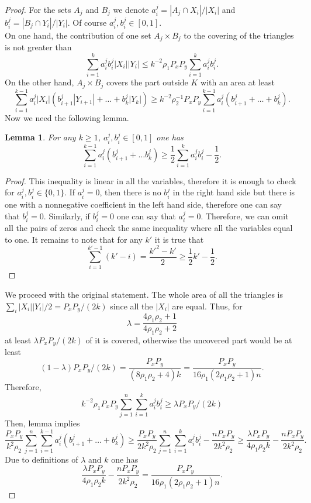 \documentclass{amsart}
\newtheorem{lemma}[theorem]{Lemma}
\theoremstyle{remark}
\numberwithin{equation}{section}
\numberwithin{figure}{section}
\begin{document}
\begin{proof}
	For the sets $A_j$ and $B_j$ we denote $a_i^j = |A_j\cap X_i|/|X_i|$ and $b_i^j = |B_j\cap Y_i|/|Y_i|$. Of course $a_i^j, b_i^j \in [0, 1]$.
	\\On one hand, the contribution of one set $A_j\times B_j$ to the covering of the triangles is not greater than
	\[
	\sum_{i=1}^k a_i^j b_i^j |X_i||Y_i| \leq k^{-2}\rho_1 P_x P_y \sum_{i=1}^k a_i^j b_i^j.
	\]
	On the other hand, $A_j\times B_j$ covers the part outside $K$ with an area at least
	\[
	\sum_{i=1}^{k-1} a_i^j |X_i|(b_{i+1}^j |Y_{i+1}| + \ldots + b_k^j|Y_k|) \geq k^{-2}\rho_2^{-1} P_x P_y \sum_{i=1}^{k-1}a_i^j (b_{i+1}^j +\ldots + b_k^j).
	\]
	Now we need the following lemma.
	\begin{lemma}
		For any $k\geq 1$, $a_i^j, b_i^j \in [0, 1]$ one has
		\[
		\sum_{i=1}^{k-1} a_i^j (b_{i+1}^j + \ldots b_k^j) \geq \frac{1}{2} \sum_{i=1}^k a_i^j b_i^j - \frac{1}{2}.
		\]
	\end{lemma}	
	\begin{proof}
		This inequality is linear in all the variables, therefore it is enough to check for $a_i^j, b_i^j \in \{0, 1\}$.
		If $a_i^j = 0$, then there is no $b_i^j$ in the right hand side but there is one with a nonnegative coefficient in the left hand side, therefore one can say that $b_i^j = 0$.
		Similarly, if $b_i^j = 0$ one can say that $a_i^j = 0$. Therefore, we can omit all the pairs of zeros and check the same inequality where all the variables equal to one. It remains to note that for any $k'$ it is true that
		\[
		\sum_{i=1}^{k'-1} (k'-i) = \frac{k'^2 - k'}{2}\geq \frac{1}{2}k' -\frac{1}{2}.
		\]
	\end{proof}
	We proceed with the original statement. The whole area of all the triangles is $\sum_i |X_i| |Y_i|/2 = P_x P_y / (2k)$ since all the $|X_i|$ are equal. Thus, for 
	\[
	\lambda = \frac{4\rho_1\rho_2 + 1}{ 4\rho_1\rho_2+2}
	\]
	at least $\lambda P_x P_y / (2k)$ of it is covered, otherwise the uncovered part would be at least 
	\[
	(1 - \lambda) P_x P_y / (2k) = \frac{P_x P_y}{(8\rho_1\rho_2 + 4) k} = \frac{P_x P_y}{16\rho_1 (2\rho_1\rho_2+1)n}.
	\]
	Therefore,
	\[
	k^{-2}\rho_1 P_x P_y \sum_{j=1}^n \sum_{i=1}^{k} a_i^j b_i^j \geq \lambda P_x P_y / (2k)
	\]
	Then, lemma implies
	\[
	\frac{P_x P_y}{k^2 \rho_2}\sum_{j=1}^n \sum_{i=1}^{k-1} a_i^j (b_{i+1}^j + \ldots + b_k^j) 
	\geq \frac{P_x P_y}{2k^2\rho_2} \sum_{j=1}^n \sum_{i=1}^k a_i^j b_i^j - \frac{n P_x P_y}{2k^2\rho_2 }\geq \frac{\lambda P_x P_y}{4\rho_1\rho_2 k} - \frac{n P_x P_y}{2k^2\rho_2 }.
	\]
	Due to definitions of $\lambda$ and $k$ one has
	\[
	\frac{\lambda P_x P_y}{4\rho_1\rho_2 k} - \frac{n P_x P_y}{2k^2\rho_2 } = \frac{P_x P_y}{16\rho_1 (2\rho_1 \rho_2 + 1)n} .
	\]
\end{proof}	
\end{document}
